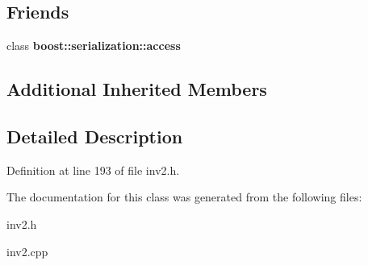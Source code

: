 \subsection*{Friends}
\begin{DoxyCompactItemize}
\item 
\hypertarget{class_boots_ac98d07dd8f7b70e16ccb9a01abf56b9c}{}\label{class_boots_ac98d07dd8f7b70e16ccb9a01abf56b9c} 
class {\bfseries boost\+::serialization\+::access}
\end{DoxyCompactItemize}
\subsection*{Additional Inherited Members}


\subsection{Detailed Description}


Definition at line 193 of file inv2.\+h.



The documentation for this class was generated from the following files\+:\begin{DoxyCompactItemize}
\item 
inv2.\+h\item 
inv2.\+cpp\end{DoxyCompactItemize}
